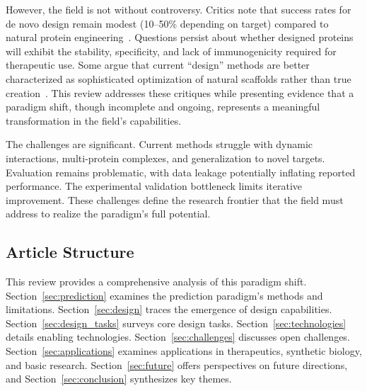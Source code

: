 However, the field is not without controversy. Critics note that success rates for de novo design remain modest (10--50\% depending on target) compared to natural protein engineering~\cite{bernett2024bias}. Questions persist about whether designed proteins will exhibit the stability, specificity, and lack of immunogenicity required for therapeutic use. Some argue that current ``design'' methods are better characterized as sophisticated optimization of natural scaffolds rather than true creation~\cite{kewalramani2023state}. This review addresses these critiques while presenting evidence that a paradigm shift, though incomplete and ongoing, represents a meaningful transformation in the field's capabilities.

The challenges are significant. Current methods struggle with dynamic interactions, multi-protein complexes, and generalization to novel targets. Evaluation remains problematic, with data leakage potentially inflating reported performance. The experimental validation bottleneck limits iterative improvement. These challenges define the research frontier that the field must address to realize the paradigm's full potential.

\subsection*{Article Structure}

This review provides a comprehensive analysis of this paradigm shift. Section~\ref{sec:prediction} examines the prediction paradigm's methods and limitations. Section~\ref{sec:design} traces the emergence of design capabilities. Section~\ref{sec:design_tasks} surveys core design tasks. Section~\ref{sec:technologies} details enabling technologies. Section~\ref{sec:challenges} discusses open challenges. Section~\ref{sec:applications} examines applications in therapeutics, synthetic biology, and basic research. Section~\ref{sec:future} offers perspectives on future directions, and Section~\ref{sec:conclusion} synthesizes key themes.

